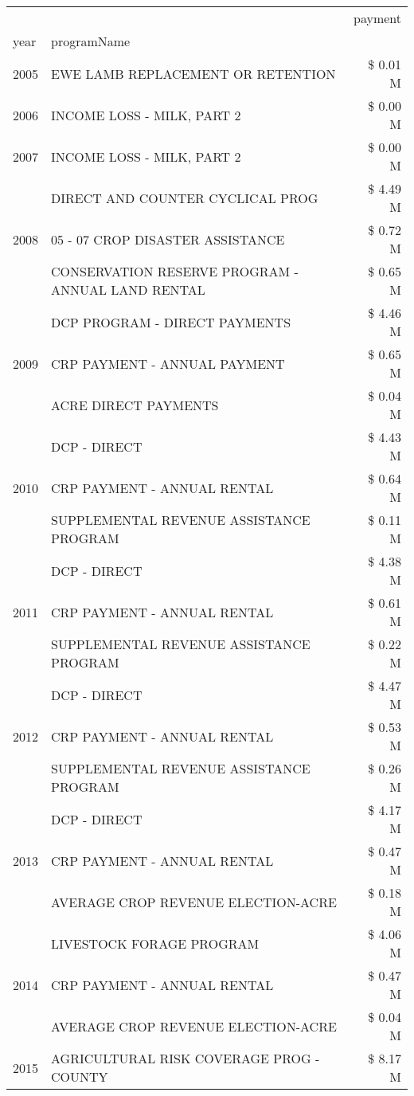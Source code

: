 \begin{tabular}{llr}
\toprule
 &  & payment \\
year & programName &  \\
\midrule
2005 & EWE LAMB REPLACEMENT OR RETENTION & \$ 0.01 M \\
\cline{1-3}
2006 & INCOME LOSS - MILK, PART 2 & \$ 0.00 M \\
\cline{1-3}
2007 & INCOME LOSS - MILK, PART 2 & \$ 0.00 M \\
\cline{1-3}
\multirow[t]{3}{*}{2008} & DIRECT AND COUNTER CYCLICAL PROG & \$ 4.49 M \\
 & 05 - 07 CROP DISASTER ASSISTANCE & \$ 0.72 M \\
 & CONSERVATION RESERVE PROGRAM - ANNUAL LAND RENTAL & \$ 0.65 M \\
\cline{1-3}
\multirow[t]{3}{*}{2009} & DCP PROGRAM - DIRECT PAYMENTS & \$ 4.46 M \\
 & CRP PAYMENT - ANNUAL PAYMENT & \$ 0.65 M \\
 & ACRE DIRECT PAYMENTS & \$ 0.04 M \\
\cline{1-3}
\multirow[t]{3}{*}{2010} & DCP - DIRECT & \$ 4.43 M \\
 & CRP PAYMENT - ANNUAL RENTAL & \$ 0.64 M \\
 & SUPPLEMENTAL REVENUE ASSISTANCE PROGRAM & \$ 0.11 M \\
\cline{1-3}
\multirow[t]{3}{*}{2011} & DCP - DIRECT & \$ 4.38 M \\
 & CRP PAYMENT - ANNUAL RENTAL & \$ 0.61 M \\
 & SUPPLEMENTAL REVENUE ASSISTANCE PROGRAM & \$ 0.22 M \\
\cline{1-3}
\multirow[t]{3}{*}{2012} & DCP - DIRECT & \$ 4.47 M \\
 & CRP PAYMENT - ANNUAL RENTAL & \$ 0.53 M \\
 & SUPPLEMENTAL REVENUE ASSISTANCE PROGRAM & \$ 0.26 M \\
\cline{1-3}
\multirow[t]{3}{*}{2013} & DCP - DIRECT & \$ 4.17 M \\
 & CRP PAYMENT - ANNUAL RENTAL & \$ 0.47 M \\
 & AVERAGE CROP REVENUE ELECTION-ACRE & \$ 0.18 M \\
\cline{1-3}
\multirow[t]{3}{*}{2014} & LIVESTOCK FORAGE PROGRAM & \$ 4.06 M \\
 & CRP PAYMENT - ANNUAL RENTAL & \$ 0.47 M \\
 & AVERAGE CROP REVENUE ELECTION-ACRE & \$ 0.04 M \\
\cline{1-3}
\multirow[t]{3}{*}{2015} & AGRICULTURAL RISK COVERAGE PROG - COUNTY & \$ 8.17 M \\

\end{tabular}
